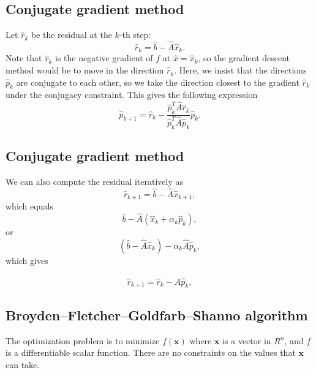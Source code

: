\documentclass[%
oneside,                 %
final,                   %
10pt]{article}
\begin{document}
\subsection*{Conjugate gradient method}

Let  $\hat{r}_k$ be the residual at the $k$-th step:
\begin{equation*}
\hat{r}_k=\hat{b}-\hat{A}\hat{x}_k.
\end{equation*}
Note that $\hat{r}_k$ is the negative gradient of $f$ at 
$\hat{x}=\hat{x}_k$, 
so the gradient descent method would be to move in the direction $\hat{r}_k$. 
Here, we insist that the directions $\hat{p}_k$ are conjugate to each other, 
so we take the direction closest to the gradient $\hat{r}_k$  
under the conjugacy constraint. 
This gives the following expression
\begin{equation*}
\hat{p}_{k+1}=\hat{r}_k-\frac{\hat{p}_k^T \hat{A}\hat{r}_k}{\hat{p}_k^T\hat{A}\hat{p}_k} \hat{p}_k.
\end{equation*}

\subsection*{Conjugate gradient method}

We can also  compute the residual iteratively as
\begin{equation*}
\hat{r}_{k+1}=\hat{b}-\hat{A}\hat{x}_{k+1},
 \end{equation*}
which equals
\begin{equation*}
\hat{b}-\hat{A}(\hat{x}_k+\alpha_k\hat{p}_k),
 \end{equation*}
or
\begin{equation*}
(\hat{b}-\hat{A}\hat{x}_k)-\alpha_k\hat{A}\hat{p}_k,
 \end{equation*}
which gives

\begin{equation*}
\hat{r}_{k+1}=\hat{r}_k-\hat{A}\hat{p}_{k},
 \end{equation*}

\subsection*{Broyden–Fletcher–Goldfarb–Shanno algorithm}

The optimization problem is to minimize $f(\mathbf {x} )$ where $\mathbf {x}$  is a vector in $R^{n}$, and $f$ is a differentiable scalar function. There are no constraints on the values that  $\mathbf {x}$  can take.
\end{document}
